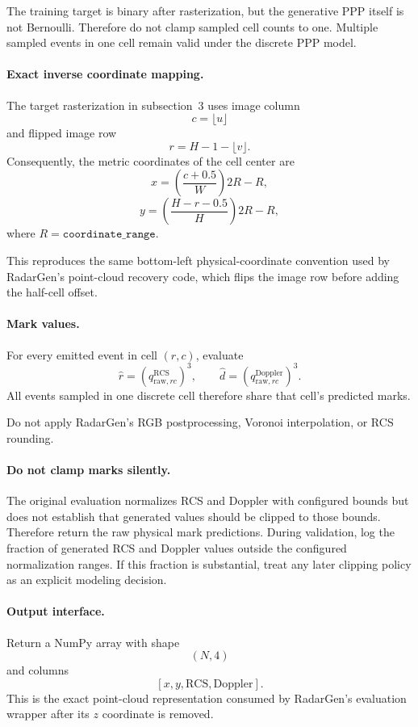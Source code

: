 \documentclass[11pt,a4paper]{article}
\begin{document}
The training target is binary after rasterization, but the generative PPP itself is not Bernoulli. Therefore do not clamp sampled cell counts to one. Multiple sampled events in one cell remain valid under the discrete PPP model.

\paragraph{Exact inverse coordinate mapping.}
The target rasterization in subsection~3 uses image column
\[
    c=\lfloor u\rfloor
\]
and flipped image row
\[
    r=H-1-\lfloor v\rfloor.
\]
Consequently, the metric coordinates of the cell center are
\[
    x
    =
    \left(
        \frac{c+0.5}{W}
    \right)
    2R-R,
\]
\[
    y
    =
    \left(
        \frac{H-r-0.5}{H}
    \right)
    2R-R,
\]
where \(R=\texttt{coordinate\_range}\).

This reproduces the same bottom-left physical-coordinate convention used by RadarGen's point-cloud recovery code, which flips the image row before adding the half-cell offset.

\paragraph{Mark values.}
For every emitted event in cell \((r,c)\), evaluate
\[
    \hat r
    =
    \left(
        q_{\mathrm{raw},rc}^{\mathrm{RCS}}
    \right)^3,
    \qquad
    \hat d
    =
    \left(
        q_{\mathrm{raw},rc}^{\mathrm{Doppler}}
    \right)^3.
\]
All events sampled in one discrete cell therefore share that cell's predicted marks.

Do not apply RadarGen's RGB postprocessing, Voronoi interpolation, or RCS rounding.

\paragraph{Do not clamp marks silently.}
The original evaluation normalizes RCS and Doppler with configured bounds but does not establish that generated values should be clipped to those bounds. Therefore return the raw physical mark predictions. During validation, log the fraction of generated RCS and Doppler values outside the configured normalization ranges. If this fraction is substantial, treat any later clipping policy as an explicit modeling decision.

\paragraph{Output interface.}
Return a NumPy array with shape
\[
    (N,4)
\]
and columns
\[
    [x,y,\mathrm{RCS},\mathrm{Doppler}].
\]
This is the exact point-cloud representation consumed by RadarGen's evaluation wrapper after its \(z\) coordinate is removed.
\end{document}

